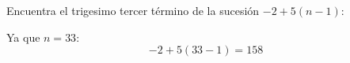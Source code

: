Encuentra el trigesimo tercer término de la sucesión $-2+5(n-1)$:

\begin{solutionbox}{1.6cm}
    Ya que $n=33$:
    \[-2+5(33-1)=158\]
\end{solutionbox}